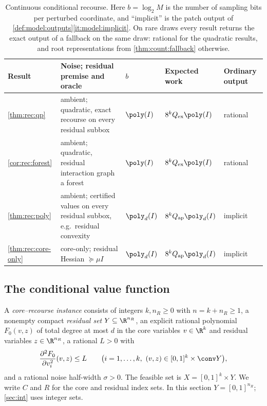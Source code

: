 \begin{table}[t]
\centering
\caption{Continuous conditional recourse. Here $b=\log_2M$ is the number of
sampling bits per perturbed coordinate, and ``implicit'' is the patch output of
\cref{def:model:outputs}\ref{it:model:implicit}. On rare draws every result
returns the exact output of a fallback on the same draw: rational for the
quadratic results, and root representations from \cref{thm:count:fallback}
otherwise.}
\label{tab:rec:summary}
\small
\begin{tabularx}{\textwidth}{@{}lXlll@{}}
\toprule
Result & Noise; residual premise and oracle & $b$ & Expected work & Ordinary output\\
\midrule
\cref{thm:rec:qp} & ambient; quadratic, exact recourse on every residual
subbox & $\poly(I)$ & $8^kQ_{\rm ex}\poly(I)$ & rational\\
\cref{cor:rec:forest} & ambient; quadratic, residual interaction graph a
forest & $\poly(I)$ & $8^kQ_{\rm ex}\poly(I)$ & rational\\
\cref{thm:rec:poly} & ambient; certified values on every residual subbox,
e.g.\ residual convexity & $\poly_d(I)$ & $8^kQ_{\rm ap}\poly_d(I)$ & implicit\\
\cref{thm:rec:core-only} & core-only; residual Hessian $\succeq\mu I$
& $\poly_d(I)$ & $8^kQ_{\rm ap}\poly_d(I)$ & implicit\\
\bottomrule
\end{tabularx}
\end{table}

\subsection{The conditional value function}\label{sec:rec:value}

\begin{definition}\label{def:rec:instance}
A \emph{core--recourse instance} consists of integers $k,n_R\ge0$ with
$n=k+n_R\ge1$, a nonempty compact \emph{residual set}
$Y\subseteq\R^{n_R}$, an explicit rational polynomial $F_0(v,z)$ of total
degree at most $d$ in the core variables $v\in\R^k$ and residual variables
$z\in\R^{n_R}$, a rational $L>0$ with
\begin{equation}\label{eq:rec:L}
 \frac{\partial^2F_0}{\partial v_i^2}(v,z)\le L
 \qquad\bigl(i=1,\ldots,k,\ (v,z)\in[0,1]^k\times\conv Y\bigr),
\end{equation}
and a rational noise half-width $\sigma>0$. The feasible set is
$X=[0,1]^k\times Y$. We write $C$ and $R$ for the core and residual index
sets. In this section $Y=[0,1]^{n_R}$; \cref{sec:int} uses integer sets.
\end{definition}

